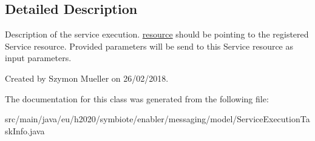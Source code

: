 \subsection{Detailed Description}
Description of the service execution. \hyperlink{}{resource} should be pointing to the registered Service resource. Provided parameters will be send to this Service resource as input parameters.

Created by Szymon Mueller on 26/02/2018. 

The documentation for this class was generated from the following file\+:\begin{DoxyCompactItemize}
\item 
src/main/java/eu/h2020/symbiote/enabler/messaging/model/Service\+Execution\+Task\+Info.\+java\end{DoxyCompactItemize}
